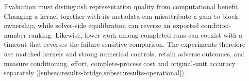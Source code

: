 Evaluation must distinguish representation quality from computational benefit.
Changing a kernel together with its metadata can misattribute a gain to block
ownership, while solver-side equilibration can reverse an exported condition-number
ranking. Likewise, lower work among completed runs can coexist with a timeout
that reverses the failure-sensitive comparison. The experiments therefore use
matched kernels and strong numerical controls, retain adverse outcomes, and
measure conditioning, effort, complete-process cost and original-unit accuracy
separately (\cref{subsec:results-bridge,subsec:results-operational}).

